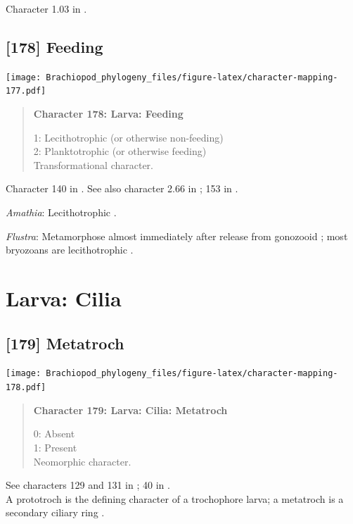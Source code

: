 \documentclass[openany]{book}
\begin{document}
Character 1.03 in \citet{Scheltema1993}.

\subsection*{{[}178{]} Feeding}\label{feeding}

\texttt{[image: Brachiopod\_phylogeny\_files/figure-latex/character-mapping-177.pdf]}

\begin{quote}
\textbf{Character 178: Larva: Feeding}

1: Lecithotrophic (or otherwise non-feeding)\\
2: Planktotrophic (or otherwise feeding)\\
Transformational character.
\end{quote}

Character 140 in \citet{Rouse1999}. See also character 2.66 in
\citet{SPS1996}; 153 in \citet{Giribet2002}.

\hypertarget{Amathia-coding-178}{}
\emph{Amathia}: Lecithotrophic \citep{Reed1982}.

\hypertarget{Flustra-coding-178}{}
\emph{Flustra}: Metamorphose almost immediately after release from
gonozooid \citep{Zimmer2013}; most bryozoans are lecithotrophic
\citep{Reed1982}.

\section{Larva: Cilia}\label{larva-cilia}

\subsection*{{[}179{]} Metatroch}\label{metatroch}

\texttt{[image: Brachiopod\_phylogeny\_files/figure-latex/character-mapping-178.pdf]}

\begin{quote}
\textbf{Character 179: Larva: Cilia: Metatroch}

0: Absent\\
1: Present\\
Neomorphic character.
\end{quote}

See characters 129 and 131 in \citet{Rouse1999}; 40 in
\citet{Haszprunar1996}.\\
A prototroch is the defining character of a trochophore larva; a
metatroch is a secondary ciliary ring \citep{Rouse1999}.
\end{document}
